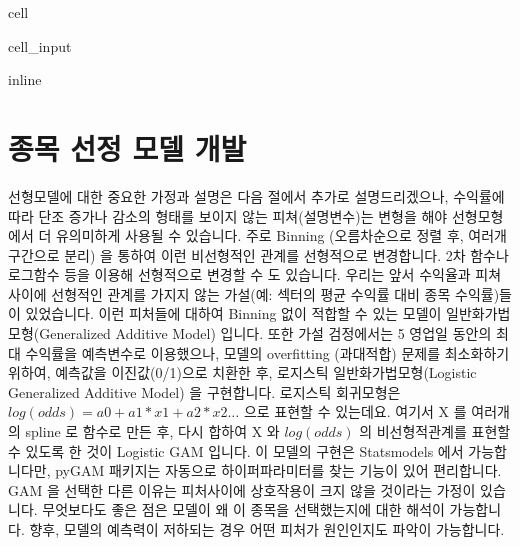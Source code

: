 \documentclass[letterpaper,10pt,english]{jupyterBook}
\begin{document}
\begin{sphinxuseclass}{cell}\begin{sphinxVerbatimInput}

\begin{sphinxuseclass}{cell_input}
\begin{sphinxVerbatim}[commandchars=\\\{\}]
   
 inline
   
   
   
 
 
  
\end{sphinxVerbatim}

\end{sphinxuseclass}\end{sphinxVerbatimInput}

\end{sphinxuseclass}

\part{종목 선정 모델 개발}
\label{\detokenize{chapter5/5.2.3_GAM:id1}}\label{\detokenize{chapter5/5.2.3_GAM::doc}}
\sphinxAtStartPar
선형모델에 대한 중요한 가정과 설명은 다음 절에서 추가로 설명드리겠으나,  수익률에 따라 단조 증가나 감소의 형태를 보이지 않는 피쳐(설명변수)는 변형을 해야 선형모형에서 더 유의미하게 사용될 수 있습니다.  주로 Binning (오름차순으로 정렬 후, 여러개 구간으로 분리) 을 통하여 이런 비선형적인 관계를 선형적으로 변경합니다. 2차 함수나 로그함수 등을 이용해 선형적으로 변경할 수 도 있습니다. 우리는 앞서 수익율과 피쳐사이에 선형적인 관계를 가지지 않는 가설(예: 섹터의 평균 수익률 대비 종목 수익률)들 이 있었습니다. 이런 피처들에 대하여 Binning 없이 적합할 수 있는 모델이 일반화가법모형(Generalized Additive Model) 입니다. 또한 가설 검정에서는 5 영업일 동안의 최대 수익률을 예측변수로 이용했으나, 모델의 overfitting (과대적합) 문제를 최소화하기 위하여, 예측값을 이진값(0/1)으로 치환한 후, 로지스틱 일반화가법모형(Logistic Generalized Additive Model) 을 구현합니다. 로지스틱 회귀모형은 \(log(odds) = a0 + a1*x1 + a2*x2 …\)  으로 표현할 수 있는데요. 여기서 X 를 여러개의 spline 로 함수로 만든 후, 다시 합하여 X 와 \(log(odds)\) 의  비선형적관계를 표현할 수 있도록 한 것이  Logistic GAM 입니다.  이 모델의 구현은 Statsmodels 에서 가능합니다만, pyGAM 패키지는 자동으로 하이퍼파라미터를 찾는 기능이 있어 편리합니다. GAM 을 선택한 다른 이유는 피처사이에 상호작용이 크지 않을 것이라는 가정이 있습니다. 무엇보다도 좋은 점은 모델이 왜 이 종목을 선택했는지에 대한 해석이 가능합니다. 향후, 모델의 예측력이 저하되는 경우 어떤 피처가 원인인지도 파악이 가능합니다.
\end{document}
